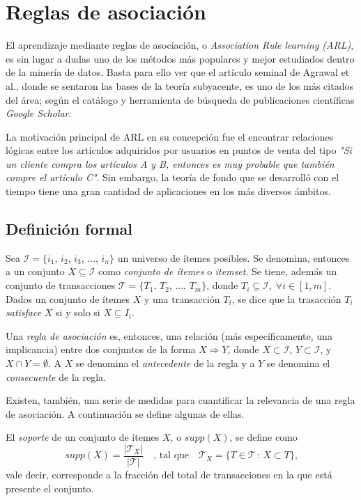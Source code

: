 \section{Reglas de asociación}

El aprendizaje mediante reglas de asociación, o \textit{Association Rule learning (ARL)}, es sin lugar a dudas uno de los métodos más populares y mejor estudiados dentro de la minería de datos. Basta para ello ver que el artículo seminal de Agrawal et al.\cite{agrawal1993mining}, donde se sentaron las bases de la teoría subyacente, es uno de los más citados del área; según el catálogo y herramienta de búsqueda de publicaciones científicas \textit{Google Scholar}.

La motivación principal de ARL en su concepción fue el encontrar relaciones lógicas entre los artículos adquiridos por usuarios en puntos de venta del tipo \textit{"Si un cliente compra los artículos A y B, entonces es muy probable que también compre el artículo C"}. Sin embargo, la teoría de fondo que se desarrolló con el tiempo tiene una gran cantidad de aplicaciones en los más diversos ámbitos.

\subsection{Definición formal}

Sea $\mathcal{I} = \{i_1,\,i_2,\,i_3,\,\ldots ,\,i_n\}$ un universo de ítemes posibles. Se denomina, entonces a un conjunto $X \subseteq \mathcal{I}$ como \textit{conjunto de ítemes} o \textit{itemset}. Se tiene, además un conjunto de transacciones $\mathcal{T} = \{T_1,\,T_2,\,\ldots,\,T_m\}$, donde $T_i \subseteq \mathcal{I}, \; \forall i \in {[1,m]}$. Dados un conjunto de ítemes $X$ y una transacción $T_i$, se dice que la trasacción $T_i$ \textit{satisface} $X$ si y solo si $X \subseteq I_i$.

Una \textit{regla de asociación} es, entonces, una relación (más específicamente, una implicancia) entre dos conjuntos de la forma $X \Rightarrow Y$, donde $X \subset \mathcal{I}$, $Y \subset \mathcal{I}$, y $X \cap Y = \emptyset$. A $X$ se denomina el \textit{antecedente} de la regla y a $Y$ se denomina el \textit{consecuente} de la regla.

Existen, también, una serie de medidas para cuantificar la relevancia de una regla de asociación. A continuación se define algunas de ellas.

El \textit{soporte} de un conjunto de ítemes $X$, o $\mathit{supp}(X)$, se define como $$\mathit{supp}(X) = \frac{|\mathcal{T}_X|}{|\mathcal{T}|} \quad \text{, tal que} \quad \mathcal{T}_X = \{T \in \mathcal{T} \, : \, X \subset T \}\text{,}$$ vale decir, corresponde a la fracción del total de transacciones en la que está presente el conjunto.

